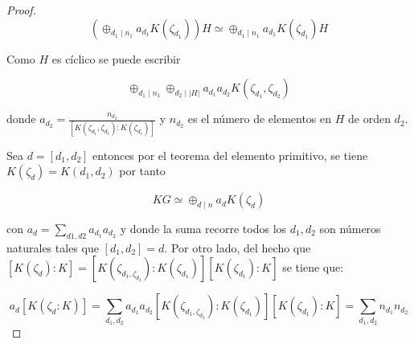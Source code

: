 \begin{proof}
\[ \left( \oplus_{d_1\mid n_1}a_{d_1}K(\zeta_{d_1}) \right)H \simeq \oplus_{d_1 \mid n_1} a_{d_1}K(\zeta_{d_1})H   \]

Como $H$ es cíclico se puede escribir

\[ \oplus_{d_1\mid n_1}\oplus_{d_2\mid |H|}a_{d_1}a_{d_2}K(\zeta_{d_1}, \zeta_{d_2})  \]

donde $a_{d_2} = \frac{n_{d_2}}{[K(\zeta_{d_1}, \zeta_{d_2} ): K(\zeta_{d_1})]}$ y $n_{d_2}$ es el número de elementos en $H$ de orden $d_2$.

Sea $d = [d_1, d_2]$ entonces por el teorema del elemento primitivo, se tiene $K(\zeta_d) = K(d_1,d_2)$ por tanto 

\[ KG \simeq \oplus_{d\mid n}a_dK(\zeta_d)  \]

con $a_d = \sum_{d1,d2}a_{d_1}a_{d_2}$ y donde la  suma recorre todos los $d_1,d_2$ son números naturales tales que $[d_1,d_2] = d$. Por otro lado, del hecho que $[K(\zeta_d):K] = [K(\zeta_{d_1, \zeta_{d_2}}): K(\zeta_{d_1})][K(\zeta_{d_1}):K] $ se tiene que: 


\[ a_d[K(\zeta_{d} :K)] = \sum_{d_1,d_2}a_{d_1}a_{d_2}[K(\zeta_{d_1, \zeta_{d_2}}): K(\zeta_{d_1})][K(\zeta_{d_1}):K] = \sum_{d_1,d_2}n_{d_1}n_{d_2}   \]

\end{proof}
